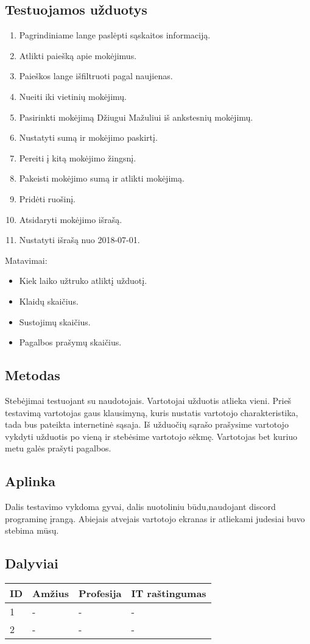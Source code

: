 \documentclass[oneside]{VUMIFPSkursinis}
\begin{document}
\subsection{Testuojamos užduotys}
\begin{enumerate}
	\item Pagrindiniame lange paslėpti sąskaitos informaciją.
	\item Atlikti paiešką apie mokėjimus.
	\item Paieškos lange išfiltruoti pagal naujienas.
	\item Nueiti iki vietinių mokėjimų.
	\item Pasirinkti mokėjimą Džiugui Mažuliui iš ankstesnių mokėjimų.
	\item Nustatyti sumą ir mokėjimo paskirtį.
	\item Pereiti į kitą mokėjimo žingsnį.
	\item Pakeisti mokėjimo sumą ir atlikti mokėjimą.
	\item Pridėti ruošinį.
	\item Atsidaryti mokėjimo išrašą.
	\item Nustatyti išrašą nuo 2018-07-01.
\end{enumerate}
Matavimai:
\begin{itemize}
	\item Kiek laiko užtruko atliktį užduotį.
	\item Klaidų skaičius.
	\item Sustojimų skaičius.
	\item Pagalbos prašymų skaičius.
\end{itemize}
\subsection{Metodas}
Stebėjimai testuojant su naudotojais. Vartotojai užduotis atlieka vieni. Prieš testavimą vartotojas gaus klausimyną, kuris nustatis vartotojo charakteristika, tada bus pateikta internetinė sąsaja. Iš užduočių sąrašo prašysime vartotojo vykdyti užduotis po vieną ir stebėsime vartotojo sėkmę. Vartotojas bet kuriuo metu galės prašyti pagalbos. 
\subsection{Aplinka}
Dalis testavimo vykdoma gyvai, dalis nuotoliniu būdu,naudojant discord programinę įrangą. Abiejais atvejais vartotojo ekranas ir atliekami judesiai buvo stebima mūsų.
\subsection{Dalyviai}
\begin{center}
	\begin{tabular}{ |p{1cm} | p{2cm} | p{4cm} | p{4cm} |}
	\hline
ID&Amžius&Profesija&IT raštingumas \\ \hline
1&-&-&- \\ \hline
2&-&-&- \\ \hline
\end{tabular}
\end{center}
\end{document}
